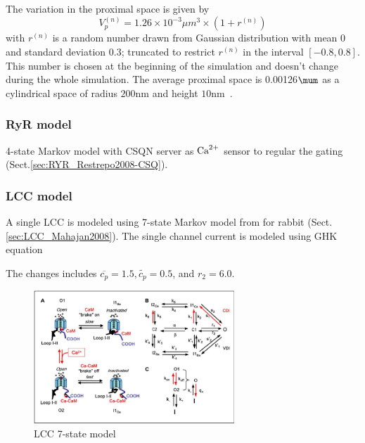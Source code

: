 The variation in the proximal space is given by
\begin{equation}
  \label{eq:873}
  V_p^{(n)} = 1.26\times 10^{-3}\mu m^3 \times (1+r^{(n)})
\end{equation}
with $r^{(n)}$ is a random  number drawn from Gaussian distribution with
mean 0 and standard deviation 0.3; truncated to restrict $r^{(n)}$ in the
interval $[-0.8, 0.8]$. This number is chosen at the beginning of the
simulation and doesn't change during the whole simulation. The average
proximal space is 0.00126$\mum$ as a cylindrical space of radius
$200$nm and height $10$nm~\citep{hinch2004mag}.

\subsubsection{RyR model}

4-state Markov model with CSQN server as ${\text{Ca}^{2+}}$ sensor to regular the gating
(Sect.\ref{sec:RYR_Restrepo2008-CSQ}).

 

\subsubsection{LCC model}

A single LCC is modeled using 7-state Markov model from \citep{mahajan2008} for
rabbit (Sect.\ref{sec:LCC_Mahajan2008}). The single channel current is modeled using GHK
equation

The changes includes $\overline{c_p}=1.5, \tilde{c_p}=0.5$, and $r_2=6.0$. 

\begin{figure}[hbt]
  \centerline{\includegraphics[height=5cm,
    angle=0]{./images/mahajan_LCC.eps}}
  \caption{LCC 7-state model}
  \label{fig:mahajan_LCC}
\end{figure}


